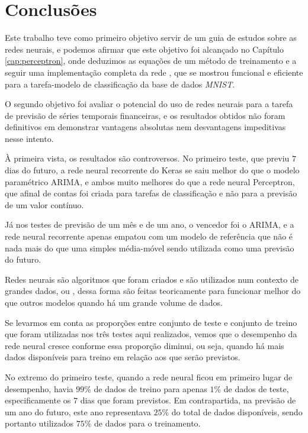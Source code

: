 
\chapter{Conclusões}
\label{cap:conclusoes}

Este trabalho teve como primeiro objetivo servir de um guia de estudos sobre as redes neurais, e podemos afirmar que este objetivo foi alcançado no Capítulo \ref{cap:perceptron}, onde deduzimos as equações de um método de treinamento e a seguir uma implementação completa da rede , que se mostrou funcional e eficiente para a tarefa-modelo de classificação da base de dados \emph{MNIST}.

O segundo objetivo foi avaliar o potencial do uso de redes neurais para a tarefa de previsão de séries temporais financeiras, e os resultados obtidos não foram definitivos em demonstrar vantagens absolutas nem desvantagens impeditivas nesse intento.

À primeira vista, os resultados são controversos. No primeiro teste, que previu $7$ dias do futuro, a rede neural recorrente do Keras se saiu melhor do que o modelo paramétrico ARIMA, e ambos muito melhores do que a rede neural Perceptron, que afinal de contas foi criada para tarefas de classificação e não para a previsão de um valor contínuo.

Já nos testes de previsão de um mês e de um ano, o vencedor foi o ARIMA, e a rede neural recorrente apenas empatou com um modelo de referência que não é nada mais do que uma simples média-móvel sendo utilizada como uma previsão do futuro.

Redes neurais são algoritmos que foram criados e são utilizados num contexto de grandes dados, ou , dessa forma são feitas teoricamente para funcionar melhor do que outros modelos quando há um grande volume de dados.

Se levarmos em conta as proporções entre conjunto de teste e conjunto de treino que foram utilizadas nos três testes aqui realizados, vemos que o desempenho da rede neural cresce conforme essa proporção diminui, ou seja, quando há mais dados disponíveis para treino em relação aos que serão previstos. 

No extremo do primeiro teste, quando a rede neural ficou em primeiro lugar de desempenho, havia $99\%$ de dados de treino para apenas $1\%$ de dados de teste, especificamente os $7$ dias que foram previstos. Em contrapartida, na previsão de um ano do futuro, este ano representava $25\%$ do total de dados disponíveis, sendo portanto utilizados $75\%$ de dados para o treinamento.


